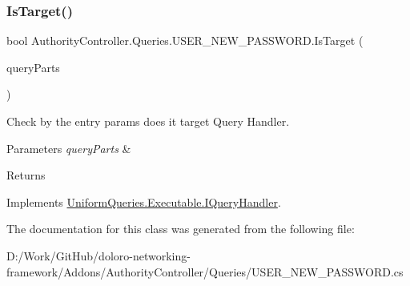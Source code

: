 \subsubsection{\texorpdfstring{Is\+Target()}{IsTarget()}}
{\footnotesize\ttfamily bool Authority\+Controller.\+Queries.\+U\+S\+E\+R\+\_\+\+N\+E\+W\+\_\+\+P\+A\+S\+S\+W\+O\+R\+D.\+Is\+Target (\begin{DoxyParamCaption}\item[{\mbox{\hyperlink{struct_uniform_queries_1_1_query_part}{Query\+Part}} \mbox{[}$\,$\mbox{]}}]{query\+Parts }\end{DoxyParamCaption})}



Check by the entry params does it target Query Handler. 


\begin{DoxyParams}{Parameters}
{\em query\+Parts} & \\
\hline
\end{DoxyParams}
\begin{DoxyReturn}{Returns}

\end{DoxyReturn}


Implements \mbox{\hyperlink{interface_uniform_queries_1_1_executable_1_1_i_query_handler_a0f43184bf3e306a7cbebc39098f044ee}{Uniform\+Queries.\+Executable.\+I\+Query\+Handler}}.



The documentation for this class was generated from the following file\+:\begin{DoxyCompactItemize}
\item 
D\+:/\+Work/\+Git\+Hub/doloro-\/networking-\/framework/\+Addons/\+Authority\+Controller/\+Queries/U\+S\+E\+R\+\_\+\+N\+E\+W\+\_\+\+P\+A\+S\+S\+W\+O\+R\+D.\+cs\end{DoxyCompactItemize}
